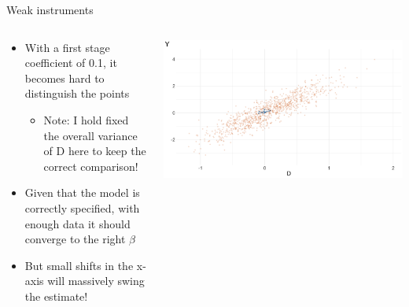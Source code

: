 \documentclass[notes,11pt, aspectratio=169]{beamer}
\begin{document}
\begin{frame}{Weak instruments}
  \begin{columns}[T] %
    \begin{column}{0.5\textwidth}
  \begin{itemize}
  \item With a first stage coefficient of 0.1, it becomes hard to distinguish the points
    \begin{itemize}
    \item Note: I hold fixed the overall variance of D here to keep
      the correct comparison!
    \end{itemize}
  \item Given that the model is correctly specified, with enough data it should converge to the right $\beta$
  \item But small shifts in the x-axis will massively swing the
    estimate!
  \end{itemize}
\end{column}
\begin{column}{0.5\textwidth}
  \includegraphics[width=\linewidth]{images/weakiv_example3.png}
\end{column}
\end{columns}
\end{frame}
\end{document}

